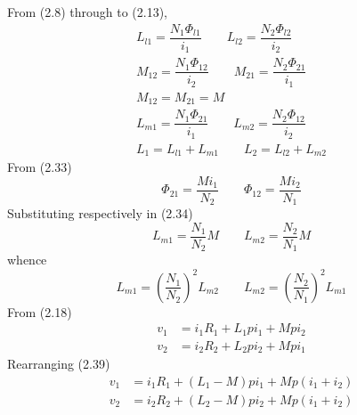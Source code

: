 \documentclass[a4paper,numbers=noenddot,12pt]{scrbook}
\begin{document}
                From (2.8) through to (2.13),
                \begin{gather}
                    L_{l1} = \dfrac{N_1 \Phi_{l1}}{i_1} \qquad L_{l2} = \dfrac{N_2 \Phi_{l2}}{i_2}\\
                    M_{12} = \dfrac{N_1 \Phi_{12}}{i_2} \qquad M_{21} = \dfrac{N_2 \Phi_{21}}{i_1}\\
                    M_{12} = M_{21} = M \nonumber\\
                    L_{m1} = \dfrac{N_1 \Phi_{21}}{i_1} \qquad L_{m2} = \dfrac{N_2 \Phi_{12}}{i_2}\\
                    L_1 = L_{l1} + L_{m1} \qquad L_2 = L_{l2} + L_{m2}
                \end{gather}
                From (2.33)
                \begin{equation}
                    \Phi_{21} = \dfrac{M i_{1}}{N_2} \qquad \Phi_{12} = \dfrac{M i_{2}}{N_1}
                    \label{eq:Eq2.36}
                \end{equation}
                Substituting respectively in (2.34)
                \begin{equation}
                    L_{m1} = \dfrac{N_1}{N_2} M \qquad L_{m2} = \dfrac{N_2}{N_1} M
                    \label{eq:Eq2.37}
                \end{equation}
                whence
                \begin{equation}
                    L_{m1} = {\left( \dfrac{N_1}{N_2}\right)}^2 L_{m2} \qquad L_{m2} = {\left( \dfrac{N_2}{N_1}\right)}^2 L_{m1}
                    \label{eq:Eq2.38}
                \end{equation}
                From (2.18)
                \begin{equation}
                    \begin{aligned}
                        v_1 & = i_1 R_1 + L_1 p i_1 + M p i_2 \\
                        v_2 & = i_2 R_2 + L_2 p i_2 + M p i_1
                    \end{aligned}
                    \label{eq:Eq2.39}
                \end{equation}
                Rearranging (2.39)
                \begin{equation}
                    \begin{aligned}
                        v_1 & = i_1 R_1 + (L_1 - M) p i_1 + M p (i_1 + i_2) \\
                        v_2 & = i_2 R_2 + (L_2 - M) p i_2 + M p (i_1 + i_2)
                    \end{aligned}
                    \label{eq:Eq2.40}
                \end{equation}
\end{document}
